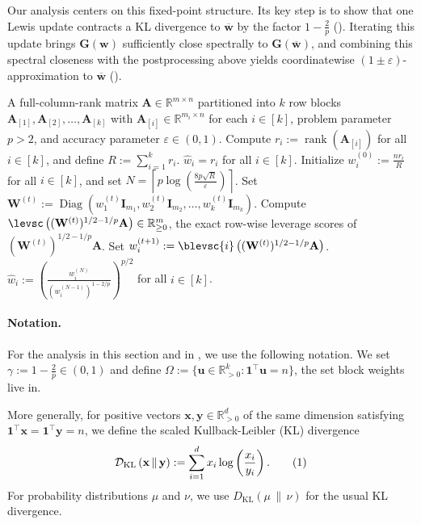 \documentclass[11pt]{article}
\newcommand\numberthis{\addtocounter{equation}{1}\tag{\theequation}}
\theoremstyle{plain}
\numberwithin{equation}{section}
\newcommand{\R}{\mathbb{R}}
\newcommand{\one}{\mathbf{1}}
\newcommand{\Diag}{\operatorname{Diag}}
\newcommand{\rank}{\operatorname{rank}}
\newcommand{\eps}{\varepsilon}
\newcommand{\Rkpos}{\mathbb{R}_{>0}^k}
\newcommand{\bA}{\mathbf{A}}
\newcommand{\bG}{\mathbf{G}}
\newcommand{\bI}{\mathbf{I}}
\newcommand{\bW}{\mathbf{W}}
\newcommand{\bw}{\mathbf{w}}
\newcommand{\bx}{\mathbf{x}}
\newcommand{\by}{\mathbf{y}}
\newcommand{\bu}{\mathbf{u}}
\newcommand{\bwbar}{\overline{\mathbf{w}}}
\newcommand{\bAblk}[1]{\mathbf{A}_{[#1]}}
\newcommand{\what}{\widehat{w}}
\newcommand{\omrp}{\gamma}
\newcommand{\kldiv}[2]{\mathcal{D}_{\mathrm{KL}}\left(#1 \,\|\, #2\right)}
\newcommand{\KL}[2]{D_{\mathrm{KL}}\left(#1 \,\|\, #2\right)}
\begin{document}
Our analysis centers on this fixed-point structure. Its key step is to show that one Lewis update contracts a KL divergence to $\bwbar$ by the factor $1-\frac{2}{p}$ (). Iterating this update brings $\bG(\bw)$ sufficiently close spectrally  to $\bG(\bwbar)$, and combining this spectral closeness with the postprocessing above yields  coordinatewise $(1\pm\eps)$-approximation to $\bwbar$ ().


\begin{algorithm}[t]
\caption{Fixed-point iteration}
\label{alg:main}
\begin{algorithmic}[1]
\Require A full-column-rank matrix $\bA\in\R^{m\times n}$  partitioned into $k$ row blocks $\bAblk{1}, \bAblk{2}, \dotsc, \bAblk{k}$ with $\bAblk{i}\in\R^{m_i\times n}$ for each $i\in[k]$, problem parameter $p>2$, and accuracy parameter $\eps\in(0, 1)$. 
\State Compute $r_i:=\rank(\bAblk{i})$ for all $i\in [k]$, and define $R:= \sum_{i = 1}^k r_i$. 
  \State \Return $\what_i=r_i$ for all $i\in[k]$. 
\EndIf
\State Initialize $w_i^{(0)}:= \frac{nr_i}{R}$ for all $i\in[k]$, and set $N = \left\lceil p \log\left(\frac{8p\sqrt{R}}{\eps}\right)\right\rceil$.
  \State Set $\bW^{(t)}:=\Diag\left(w_1^{(t)}\bI_{m_1}, w_2^{(t)}\bI_{m_2}, \dotsc, w_k^{(t)}\bI_{m_k}\right)$.
  \State Compute $\levsc\left((\bW^{(t)})^{1/2-1/p}\bA\right)\in\R^m_{\geq0}$, the  exact row-wise leverage scores of  $(\bW^{(t)})^{1/2-1/p}\bA$. 
    \State Set $w_i^{(t+1)}:= \blevsc{i}\left( (\bW^{(t)})^{1/2-1/p}\bA \right) $.
  \EndFor
\EndFor
\State \Return $\what_i:=\left(\frac{w_i^{(N)}}{(w_i^{(N-1)})^{1-2/p}}\right)^{p/2}$ for all $i\in [k]$.
\end{algorithmic}
\end{algorithm}

\paragraph{Notation.}
For the analysis in this section and in , we use the following notation. We set $\omrp:=1-\frac{2}{p}\in(0,1)$ and define  $\Omega:=\{\bu\in\Rkpos:\one^\top\bu=n\}$, the set block weights live in.

More generally, for positive vectors $\bx,\by\in\R_{>0}^d$ of the same dimension satisfying $\one^\top\bx=\one^\top\by=n$, we define the scaled Kullback-Leibler (KL) divergence
\[
\kldiv{\bx}{\by}
:=
\sum_{i=1}^d x_i\log\left(\frac{x_i}{y_i}\right).
\numberthis\label{eq:notation-KLdiv}
\]
For probability distributions $\mu$ and $\nu$, we use $\KL{\mu}{\nu}$ for the usual KL divergence.
\end{document}
